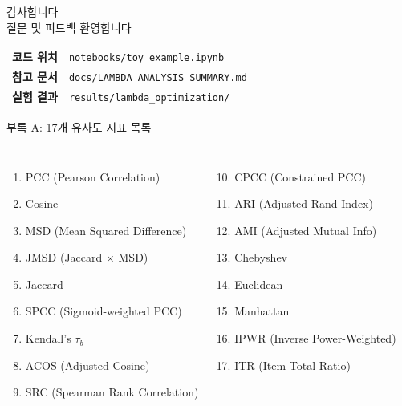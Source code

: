 \documentclass[aspectratio=169, 10pt]{beamer}
\begin{document}
\begin{frame}[plain]
  \begin{center}
    \vspace{2cm}
    {\LARGE 감사합니다}\\[1.5em]
    {\large 질문 및 피드백 환영합니다}\\[2em]
    \begin{tabular}{ll}
      \textbf{코드 위치} & \texttt{notebooks/toy\_example.ipynb} \\
      \textbf{참고 문서} & \texttt{docs/LAMBDA\_ANALYSIS\_SUMMARY.md} \\
      \textbf{실험 결과} & \texttt{results/lambda\_optimization/}
    \end{tabular}
  \end{center}
\end{frame}

\appendix

\begin{frame}{부록 A: 17개 유사도 지표 목록}
  \begin{columns}[T]
      \begin{enumerate}
        \item PCC (Pearson Correlation)
        \item Cosine
        \item MSD (Mean Squared Difference)
        \item JMSD (Jaccard × MSD)
        \item Jaccard
        \item SPCC (Sigmoid-weighted PCC)
        \item Kendall's $\tau_b$
        \item ACOS (Adjusted Cosine)
        \item SRC (Spearman Rank Correlation)
      \end{enumerate}
      \begin{enumerate}
        \setcounter{enumi}{9}
        \item CPCC (Constrained PCC)
        \item ARI (Adjusted Rand Index)
        \item AMI (Adjusted Mutual Info)
        \item Chebyshev
        \item Euclidean
        \item Manhattan
        \item IPWR (Inverse Power-Weighted)
        \item ITR (Item-Total Ratio)
      \end{enumerate}
  \end{columns}
\end{frame}
\end{document}
